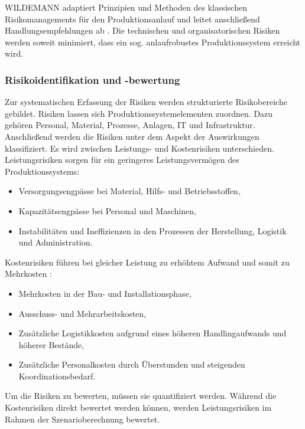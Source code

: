 WILDEMANN adaptiert Prinzipien und Methoden des klassischen Risikomanagements für den Produktionsanlauf und leitet anschließend Handlungsempfehlungen ab \cite{Wildemann2004}. Die technischen und organisatorischen Risiken werden soweit minimiert, dass ein sog. anlaufrobustes Produktionssystem erreicht wird. 


\subsubsection*{Risikoidentifikation und -bewertung}
Zur systematischen Erfassung der Risiken werden strukturierte Risikobereiche gebildet. 
Risiken lassen sich Produktionssystemelementen zuordnen. Dazu gehören Personal, Material, Prozesse, Anlagen, IT und Infrastruktur. Anschließend werden die Risiken unter dem Aspekt der Auswirkungen klassifiziert. Es wird zwischen Leistungs- und Kostenrisiken unterschieden. Leistungsrisiken sorgen für ein geringeres Leistungsvermögen des Produktionssystems:
\begin{itemize}
 \item Versorgungsengpässe bei Material,
Hilfs- und Betriebsstoffen,
\item Kapazitätsengpässe bei Personal und
Maschinen,
\item Instabilitäten und Ineffizienzen in
den Prozessen der Herstellung,
Logistik und Administration.
\end{itemize}
Kostenrisiken führen bei gleicher Leistung zu erhöhtem Aufwand und somit zu Mehrkosten \cite{Wiendahl2002}: 
\begin{itemize}
 \item Mehrkosten in der Bau- und Installationsphase,
\item Ausschuss- und Mehrarbeitskosten,
\item Zusätzliche Logistikkosten aufgrund
eines höheren Handlingaufwands
und höherer Bestände,
\item Zusätzliche Personalkosten durch
Überstunden und steigenden Koordinationsbedarf.
\end{itemize}

Um die Risiken zu bewerten, müssen sie quantifiziert werden. Während die Kostenrisiken direkt bewertet werden können, werden Leistungsrisiken im Rahmen der Szenarioberechnung bewertet. 

